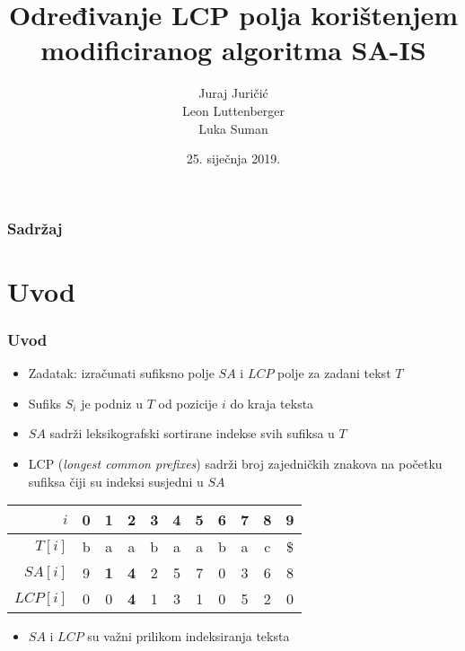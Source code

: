 \documentclass{beamer}
\title[]{Određivanje LCP polja korištenjem modificiranog algoritma SA-IS} %
\author[]{Juraj Juričić\\Leon Luttenberger\\Luka Suman} %
\institute[] %
{
\texttt{[image: res/unizg.pdf]}\\
Sveučilište u Zagrebu \\
Fakultet elektrotehnike i računarstva \\ 
\medskip
\textit{Projekt iz Bioinformatike}
}
\date{25. siječnja 2019.} %
\begin{document}
\begin{frame}
\titlepage %
\end{frame}

\begin{frame}
\frametitle{Sadržaj} %
\tableofcontents %
\end{frame}


\section{Uvod} 

\begin{frame}
\frametitle{Uvod}

\begin{itemize}
	\item Zadatak: izračunati sufiksno polje $SA$ i $LCP$ polje za zadani tekst $T$
	\item Sufiks $S_{i}$ je podniz u $T$ od pozicije $i$ do kraja teksta
	\item $SA$ sadrži leksikografski sortirane indekse svih sufiksa u $T$ 
	\item LCP (\textit{longest common prefixes}) sadrži broj zajedničkih znakova na početku sufiksa čiji su indeksi susjedni u $SA$
\end{itemize}

\begin{center}
	\begin{tabular}{r | c c c c c c c c c c |}
		$i$ & 0 & \textbf{1} & 2 & 3 & \textbf{4} & 5 & 6 & 7 & 8 & 9 \\ \hline
		$T[i]$ & b & a & a & b & a & a & b & a & c & \$ \\ \hline
		$SA[i]$ & 9 & \textbf{1} & \textbf{4} & 2 & 5 & 7 & 0 & 3 & 6 & 8 \\ \hline
		$LCP[i]$ & 0 & 0 & \textbf{4} & 1 & 3 & 1 & 0 & 5 & 2 & 0 \\ \hline
	\end{tabular}
\end{center}

\begin{itemize}
	\item $SA$ i $LCP$ su važni prilikom indeksiranja teksta
\end{itemize}

\end{frame}
\end{document}
